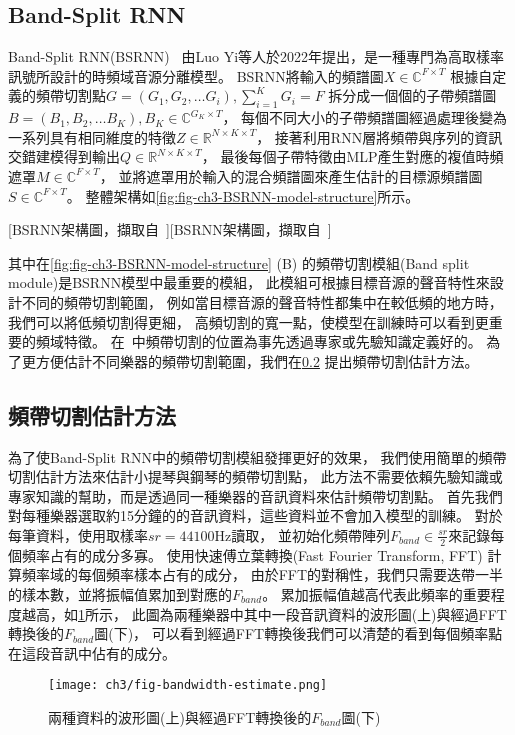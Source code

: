 \documentclass[class=NCU_thesis, crop=false]{standalone}
\begin{document}
\subsection{Band-Split RNN} \label{ch3-subst-band-split-RNN}
Band-Split RNN(BSRNN)~\cite{Luo_Yi2022MusicSourceSeparation}
由Luo Yi等人於2022年提出，是一種專門為高取樣率訊號所設計的時頻域音源分離模型。
BSRNN將輸入的頻譜圖$X\in \mathbb{C} ^{F\times T}$
根據自定義的頻帶切割點$G = (G_1, G_2, \dots G_i), \sum_{i = 1}^{K} G_i = F $
拆分成一個個的子帶頻譜圖$B = (B_1, B_2, \dots B_K), B_K \in \mathbb{C}^{G_K\times T}$，
每個不同大小的子帶頻譜圖經過處理後變為一系列具有相同維度的特徵$Z\in \mathbb{R}^{N\times K\times T}$，
接著利用RNN層將頻帶與序列的資訊交錯建模得到輸出$Q\in \mathbb{R}^{N\times K\times T}$，
最後每個子帶特徵由MLP產生對應的複值時頻遮罩$M\in \mathbb{C}^{F\times T}$，
並將遮罩用於輸入的混合頻譜圖來產生估計的目標源頻譜圖$S\in \mathbb{C}^{F\times T}$。
整體架構如\cref{fig:fig-ch3-BSRNN-model-structure}所示。

[BSRNN架構圖，擷取自~\cite{Luo_Yi2022MusicSourceSeparation}][BSRNN架構圖，擷取自~\cite{Luo_Yi2022MusicSourceSeparation}]

其中在\cref{fig:fig-ch3-BSRNN-model-structure} (B) 
的頻帶切割模組(Band split module)是BSRNN模型中最重要的模組，
此模組可根據目標音源的聲音特性來設計不同的頻帶切割範圍，
例如當目標音源的聲音特性都集中在較低頻的地方時，我們可以將低頻切割得更細，
高頻切割的寬一點，使模型在訓練時可以看到更重要的頻域特徵。
在~\cite{Luo_Yi2022MusicSourceSeparation}中頻帶切割的位置為事先透過專家或先驗知識定義好的。
為了更方便估計不同樂器的頻帶切割範圍，我們在\cref{ch3-subst-estimate-band-split-point}
提出頻帶切割估計方法。

\subsection{頻帶切割估計方法} \label{ch3-subst-estimate-band-split-point}
為了使Band-Split RNN中的頻帶切割模組發揮更好的效果，
我們使用簡單的頻帶切割估計方法來估計小提琴與鋼琴的頻帶切割點，
此方法不需要依賴先驗知識或專家知識的幫助，而是透過同一種樂器的音訊資料來估計頻帶切割點。
首先我們對每種樂器選取約15分鐘的的音訊資料，這些資料並不會加入模型的訓練。
對於每筆資料，使用取樣率$sr = 44100$Hz讀取，
並初始化頻帶陣列$F_{band} \in \frac{sr}{2}$來記錄每個頻率占有的成分多寡。
使用快速傅立葉轉換(Fast Fourier Transform, FFT)
計算頻率域的每個頻率樣本占有的成分，
由於FFT的對稱性，我們只需要迭帶一半的樣本數，並將振幅值累加到對應的$F_{band}$。
累加振幅值越高代表此頻率的重要程度越高，如\cref{fig:fig-ch3-bandwidth-estimate}所示，
此圖為兩種樂器中其中一段音訊資料的波形圖(上)與經過FFT轉換後的$F_{band}$圖(下)，
可以看到經過FFT轉換後我們可以清楚的看到每個頻率點在這段音訊中佔有的成分。
\begin{figure}[H]
    \centering
    \texttt{[image: ch3/fig-bandwidth-estimate.png]}
    \caption{兩種資料的波形圖(上)與經過FFT轉換後的$F_{band}$圖(下)}
    \label{fig:fig-ch3-bandwidth-estimate}
\end{figure}
\end{document}
